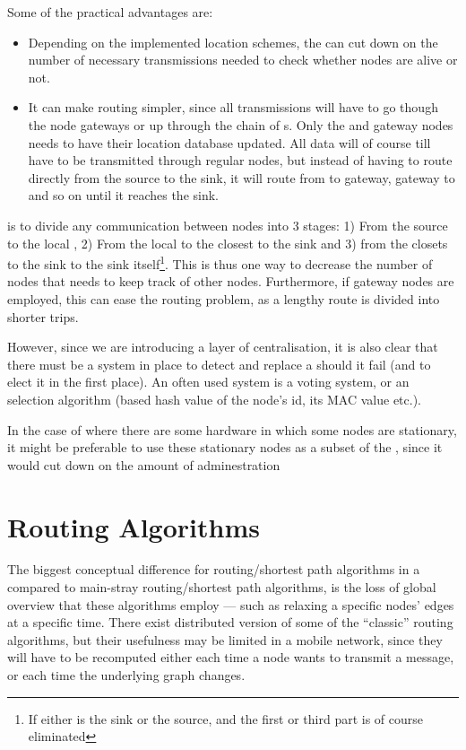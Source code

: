 \documentclass[letter, 12pt, english, draft]{article}
\begin{document}
Some of the practical advantages are:
\begin{itemize}
\item Depending on the implemented location schemes, the \ch can cut down on the number of necessary transmissions needed to check whether nodes are alive or not.
\item It can make routing simpler, since all transmissions will have to go though the node gateways or up through the chain of \ch s. Only the \ch and gateway nodes needs to have their location database updated. All data will of course till have to be transmitted through regular nodes, but instead of having to route directly from the source to the sink, it will route from \ch to gateway, gateway to \ch and so on until it reaches the sink.
\end{itemize}

\ch is to divide any communication between nodes into 3 stages: 1) From the source to the local \ch, 2) From the local \ch to the \ch closest to the sink and 3) from the \ch closets to the sink to the sink itself\footnote{If either \ch is the sink or the source, and the first or third part is of course eliminated}. This is thus one way to decrease the number of nodes that needs to keep track of other nodes. Furthermore, if gateway nodes are employed, this can ease the routing problem, as a lengthy route is divided into shorter trips.  

However, since we are introducing a layer of centralisation, it is also clear that there must be a system in place to detect and replace a \ch should it fail (and to elect it in the first place). An often used system is a voting system, or an selection algorithm (based hash value of the node's id, its MAC value etc.).

In the case of \manet where there are some hardware in which some nodes are stationary, it might be preferable to use these stationary nodes as a subset of the \ch, since it would cut down on the amount of adminestration 

\section{Routing Algorithms}

The biggest conceptual difference for routing/shortest path algorithms in a \manet compared to main-stray routing/shortest path algorithms, is the loss of global overview that these algorithms employ --- such as relaxing a specific nodes' edges at a specific time. There exist distributed version of some of the ``classic'' routing algorithms, but their usefulness may be limited in a mobile network, since they will have to be recomputed either each time a node wants to transmit a message, or each time the underlying graph changes.
\end{document}
